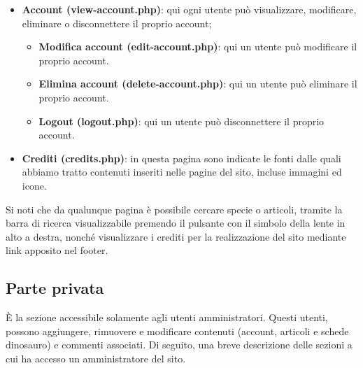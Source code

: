\documentclass[12pt]{article}
\begin{document}
\begin{itemize}
		\item \textbf{Account (view-account.php)}: qui ogni utente può visualizzare, modificare, eliminare o disconnettere il proprio account;
		\begin{itemize}
			\item \textbf{Modifica account (edit-account.php)}: qui un utente può modificare il proprio account.
		\end{itemize}
		\begin{itemize}
			\item \textbf{Elimina account (delete-account.php)}: qui un utente può eliminare il proprio account.
		\end{itemize}
		\begin{itemize}
			\item \textbf{Logout (logout.php)}: qui un utente può disconnettere il proprio account.
		\end{itemize}
	\item \textbf{Crediti (credits.php)}: in questa pagina sono indicate le fonti dalle quali abbiamo tratto contenuti inseriti nelle pagine del sito, incluse immagini ed icone.
		
	\end{itemize}
	Si noti che da qualunque pagina è possibile cercare specie o articoli, tramite la barra di ricerca visualizzabile premendo il pulsante con il simbolo della lente in alto a destra, nonché visualizzare i crediti per la realizzazione del sito mediante link apposito nel footer.

	\subsection{Parte privata}

	È la sezione accessibile solamente agli utenti amministratori. Questi utenti, possono aggiungere, rimuovere e modificare contenuti (account, articoli e schede dinosauro) e commenti associati.
	Di seguito, una breve descrizione delle sezioni a cui ha accesso un amministratore del sito.
	
\end{document}
